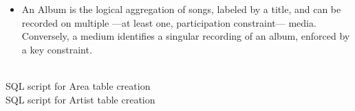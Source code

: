 \documentclass{article}
\begin{document}
{\begin{center}
\begin{itemize}
  \item An Album is the logical aggregation of songs, labeled by a title, and can be recorded on multiple ---at least one, participation constraint--- media. Conversely, a medium identifies a singular recording of an album, enforced by a key constraint.
\end{itemize}
\end{center}
}
\\
{SQL script for Area table creation}
\\
{SQL script for Artist table creation}

\end{document}
